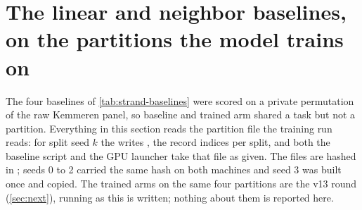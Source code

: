 
\section{The linear and neighbor baselines, on the partitions the model trains on
}
\label{sec:baselines}

The four baselines of \cref{tab:strand-baselines} were scored on a private permutation of
the raw Kemmeren panel, so baseline and trained arm shared a task but not a partition.
Everything in this section reads the partition file the training run reads: for split seed
$k$ the  writes , the record indices
per split, and both the baseline script and the GPU launcher take that file as given. The
files are hashed in ; seeds 0 to 2 carried the same hash
on both machines and seed 3 was built once and copied. The trained arms on the same four
partitions are the v13 round (\cref{sec:next}), running as this is written; nothing about
them is reported here.

